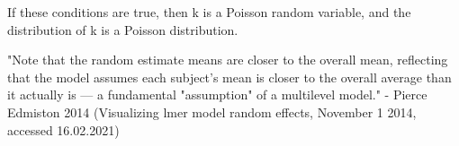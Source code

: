 If these conditions are true, then k is a Poisson random variable, and the distribution of k is a Poisson distribution.

"Note that the random estimate means are closer to the overall mean, reflecting that the model assumes each subject's mean is closer to the overall average than it actually is --- a fundamental "assumption" of a multilevel model."  - Pierce Edmiston 2014 (Visualizing lmer model random effects, November 1 2014, accessed 16.02.2021) 









%
%
%
%
%
%
